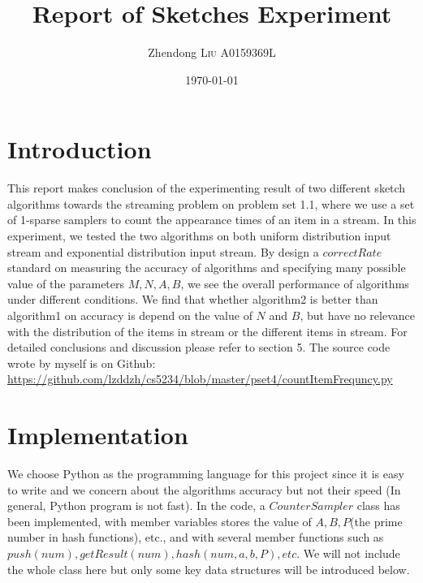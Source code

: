 \documentclass{article}
\title{Report of Sketches Experiment} %
\author{Zhendong \textsc{Liu} A0159369L} %
\date{\today} %
\begin{document}
\maketitle %

\section{Introduction}
This report makes conclusion of the experimenting result of two different sketch algorithms towards the streaming problem on problem set 1.1, where we use a set of 1-sparse samplers to count the appearance times of an item in a stream.
\newline
\newline
In this experiment, we tested the two algorithms on both uniform distribution input stream and exponential distribution input stream. By design a $correctRate$ standard on measuring the accuracy of algorithms and specifying many possible value of the parameters $M, N, A, B$, we see the overall performance of algorithms under different conditions.
\newline
\newline
We find that whether algorithm2 is better than algorithm1 on accuracy is depend on the value of $N$ and $B$, but have no relevance with the distribution of the items in stream or the different items in stream. For detailed conclusions and discussion please refer to section 5.
\newline
\newline
The source code wrote by myself is on Github:\\\url{https://github.com/lzddzh/cs5234/blob/master/pset4/countItemFrequncy.py}


 

\section{Implementation}
We choose Python as the programming language for this project   since it is easy to write and we concern about the algorithms accuracy but not their speed (In general, Python program is not fast).
In the code, a $CounterSampler$ class has been implemented, with member variables stores the value of $A, B, P$(the prime number in hash functions), etc., and with several member functions such as $push(num), getResult(num), hash(num, a, b, P), etc$. We will not include the whole class here but only some key data structures will be introduced below.
\end{document}
